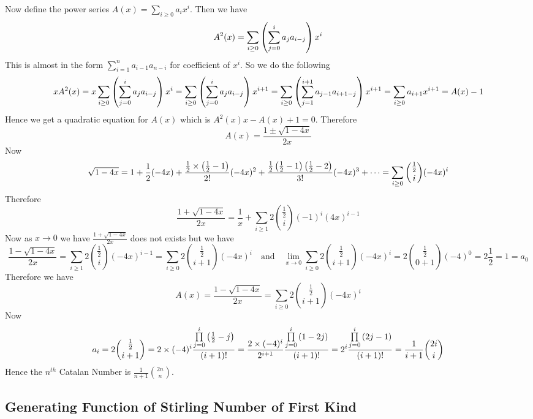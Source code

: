 Now define the power series $A(x)=\sum\limits_{i\geq 0}a_ix^i$. Then we have $$A^2(x)=\sum_{i\geq 0}\left( \sum_{j=0}^ia_ja_{i-j} \right)x^i$$This is almost in the form $\sum\limits_{i=1}^n a_{i-1}a_{n-i}$ for coefficient of $x^i$. So we do the following $$xA^2(x)=x\sum_{i\geq 0}\left( \sum_{j=0}^ia_ja_{i-j} \right)x^i=\sum_{i\geq 0}\left( \sum_{j=0}^ia_ja_{i-j} \right)x^{i+1}=\sum_{i\geq 0}\left( \sum_{j=1}^{i+1}a_{j-1}a_{i+1-j} \right)x^{i+1}=\sum_{i\geq 0}a_{i+1}x^{i+1}=A(x)-1$$
Hence we get a quadratic equation for $A(x)$ which is $A^2(x)x-A(x)+1=0$. Therefore $$A(x)=\frac{1\pm\sqrt{1-4x}}{2x}$$Now $$\sqrt{1-4x}=1+\frac12(-4x)+\frac{\frac12\times \left(\frac12-1\right)}{2!}(-4x)^2+\frac{\frac12\left(\frac12-1\right)\left(\frac12-2\right)}{3!}(-4x)^3+\cdots=\sum_{i\geq 0}\binom{\frac12}{i}(-4x)^i$$Therefore $$\frac{1+\sqrt{1-4x}}{2x}= \frac1x+\sum_{i\geq 1}2\binom{\frac12}{i}(-1)^{i}(4x)^{i-1} $$Now as $x\to 0$ we have  $\frac{1+\sqrt{1-4x}}{2x}$ does not exists but we have $$\frac{1-\sqrt{1-4x}}{2x}=\sum_{i\geq 1}2\binom{\frac12}{i}(-4x)^{i-1}=\sum_{i\geq 0}2\binom{\frac12}{i+1}(-4x)^{i}\quad \text{and}\quad \lim_{x\to 0}\sum_{i\geq 0}2\binom{\frac12}{i+1}(-4x)^{i}=2\binom{\frac12}{0+1}(-4)^{0}=2\frac12=1=a_0$$Therefore we have $$A(x)=\frac{1-\sqrt{1-4x}}{2x}=\sum_{i\geq 0}2\binom{\frac12}{i+1}(-4x)^{i}$$Now $$a_i=2\binom{\frac12}{i+1}=2\times (-4)^i\frac{\prod\limits_{j=0}^i \left(\frac12-j\right)}{(i+1)!}=\frac{2\times (-4)^i}{2^{i+1}}\frac{\prod\limits_{j=0}^i \left(1-2j\right)}{(i+1)!}= 2^i\frac{\prod\limits_{j=0}^i \left(2j-1\right)}{(i+1)!}=\frac1{i+1}\binom{2i}{i}$$Hence the $n^{th}$ Catalan Number is $\frac{1}{n+1}\binom{2n}n$. 

\subsection{Generating Function of Stirling Number of First Kind}

